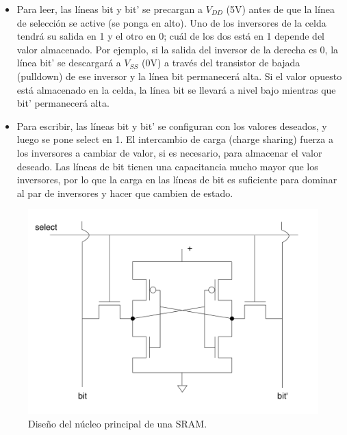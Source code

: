 \begin{itemize}
    \item Para leer, las líneas bit y bit’ se precargan a $V_{DD}$ (5V) antes de que la línea de selección se active (se ponga en alto). Uno de los inversores de la celda tendrá su salida en 1 y el otro en 0; cuál de los dos está en 1 depende del valor almacenado. Por ejemplo, si la salida del inversor de la derecha es 0, la línea bit’ se descargará a $V_{SS}$ (0V) a través del transistor de bajada (pulldown) de ese inversor y la línea bit permanecerá alta. Si el valor opuesto está almacenado en la celda, la línea bit se llevará a nivel bajo mientras que bit’ permanecerá alta.
    \item Para escribir, las líneas bit y bit’ se configuran con los valores deseados, y luego se pone select en 1. El intercambio de carga (charge sharing) fuerza a los inversores a cambiar de valor, si es necesario, para almacenar el valor deseado. Las líneas de bit tienen una capacitancia mucho mayor que los inversores, por lo que la carga en las líneas de bit es suficiente para dominar al par de inversores y hacer que cambien de estado.

\end{itemize}

\begin{figure}[H] \centering
    \includegraphics[width=0.6\linewidth]{Imagenes/02/02-Sram.png}
    \caption{Diseño del núcleo principal de una SRAM.}
    \label{Fig:02-SRAM}    
\end{figure}

\subsubsection{}

